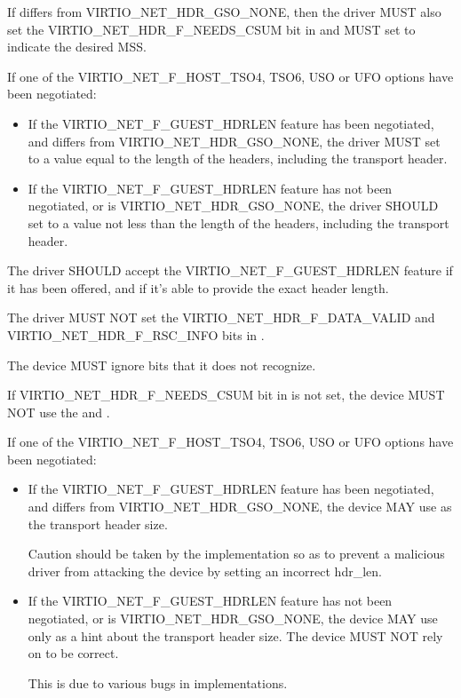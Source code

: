 If  differs from VIRTIO_NET_HDR_GSO_NONE, then
the driver MUST also set the VIRTIO_NET_HDR_F_NEEDS_CSUM bit in
 and MUST set  to indicate the
desired MSS.

If one of the VIRTIO_NET_F_HOST_TSO4, TSO6, USO or UFO options have
been negotiated:
\begin{itemize}
\item If the VIRTIO_NET_F_GUEST_HDRLEN feature has been negotiated,
	and  differs from VIRTIO_NET_HDR_GSO_NONE,
	the driver MUST set  to a value equal to the length
	of the headers, including the transport header.

\item If the VIRTIO_NET_F_GUEST_HDRLEN feature has not been negotiated,
	or  is VIRTIO_NET_HDR_GSO_NONE,
	the driver SHOULD set  to a value
	not less than the length of the headers, including the transport
	header.
\end{itemize}

The driver SHOULD accept the VIRTIO_NET_F_GUEST_HDRLEN feature if it has
been offered, and if it's able to provide the exact header length.

The driver MUST NOT set the VIRTIO_NET_HDR_F_DATA_VALID and
VIRTIO_NET_HDR_F_RSC_INFO bits in .

The device MUST ignore  bits that it does not recognize.

If VIRTIO_NET_HDR_F_NEEDS_CSUM bit in  is not set, the
device MUST NOT use the  and .

If one of the VIRTIO_NET_F_HOST_TSO4, TSO6, USO or UFO options have
been negotiated:
\begin{itemize}
\item If the VIRTIO_NET_F_GUEST_HDRLEN feature has been negotiated,
	and  differs from VIRTIO_NET_HDR_GSO_NONE,
	the device MAY use  as the transport header size.

	\begin{note}
	Caution should be taken by the implementation so as to prevent
	a malicious driver from attacking the device by setting an incorrect hdr_len.
	\end{note}

\item If the VIRTIO_NET_F_GUEST_HDRLEN feature has not been negotiated,
	or  is VIRTIO_NET_HDR_GSO_NONE,
	the device MAY use  only as a hint about the
	transport header size.
	The device MUST NOT rely on  to be correct.

	\begin{note}
	This is due to various bugs in implementations.
	\end{note}
\end{itemize}

